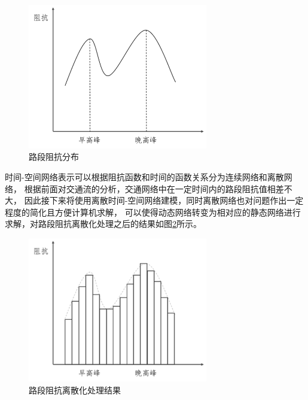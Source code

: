 \begin{figure}[H] %
    \centering %
    \includegraphics[width=0.7\textwidth]{png/图片4 路段阻抗分布} %
    \caption{路段阻抗分布} %
    \label{fig:fig4} %
\end{figure}

时间-空间网络表示可以根据阻抗函数和时间的函数关系分为连续网络和离散网络，
根据前面对交通流的分析，交通网络中在一定时间内的路段阻抗值相差不大，
因此接下来将使用离散时间-空间网络建模，同时离散网络也对问题作出一定程度的简化且方便计算机求解，
可以使得动态网络转变为相对应的静态网络进行求解，对路段阻抗离散化处理之后的结果如图\ref{fig:fig5}所示。

\begin{figure}[H] %
    \centering %
    \includegraphics[width=0.7\textwidth]{png/图片5 路段阻抗离散化处理结果} %
    \caption{路段阻抗离散化处理结果} %
    \label{fig:fig5} %
\end{figure}

